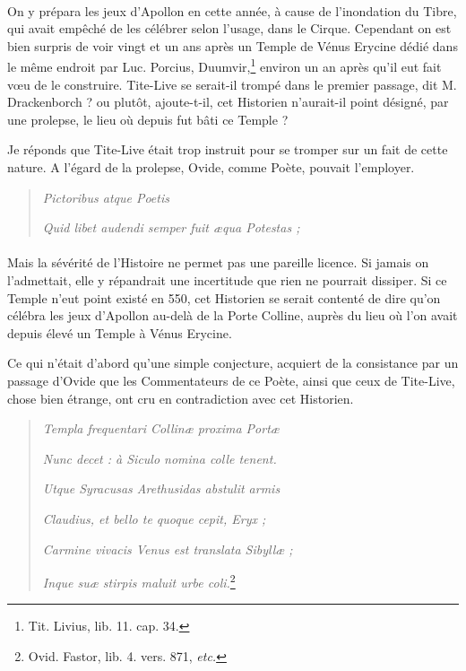 \documentclass[a4paper, 11pt, oneside, polutonikogreek, french]{article}
\begin{document}
\paragraph{}
On y prépara les jeux d'Apollon en cette année, à cause de l'inondation du Tibre, qui avait empêché de les célébrer selon l'usage, dans le Cirque. Cependant on est bien surpris de voir vingt et un ans après un Temple de Vénus Erycine dédié dans le même endroit par Luc. Porcius, Duumvir,\footnote{Tit. Livius, lib. 11. cap. 34.} environ un an après qu'il eut fait vœu de le construire. Tite-Live se serait-il trompé dans le premier passage, dit M. Drackenborch ? ou plutôt, ajoute-t-il, cet Historien n'aurait-il point désigné, par une prolepse, le lieu où depuis fut bâti ce Temple ?

Je réponds que Tite-Live était trop instruit pour se tromper sur un fait de cette nature. A l'égard de la prolepse, Ovide, comme Poète, pouvait l'employer.
\begin{quotation}
\hspace*{10mm}\emph{Pictoribus atque Poetis}

\emph{Quid libet audendi semper fuit æqua Potestas ;}
\end{quotation}
\paragraph{}
Mais la sévérité de l'Histoire ne permet pas une pareille licence. Si jamais on l'admettait, elle y répandrait une incertitude que rien ne pourrait dissiper. Si ce Temple n'eut point existé en 550, cet Historien se serait contenté de dire qu'on célébra les jeux d'Apollon au-delà de la Porte Colline, auprès du lieu où l'on avait depuis élevé un Temple à Vénus Erycine.

Ce qui n'était d'abord qu'une simple conjecture, acquiert de la consistance par un passage d'Ovide que les Commentateurs de ce Poète, ainsi que ceux de Tite-Live, chose bien étrange, ont cru en contradiction avec cet Historien.
\begin{quotation}
\emph{Templa frequentari Collinæ proxima Portæ}

\hspace*{5mm}\emph{Nunc decet : à Siculo nomina colle tenent.}

\emph{Utque Syracusas Arethusidas abstulit armis}

\hspace*{5mm}\emph{Claudius, et bello te quoque cepit, Eryx ;}

\emph{Carmine vivacis Venus est translata Sibyllæ ;}

\hspace*{5mm}\emph{Inque suæ stirpis maluit urbe coli.}\footnote{Ovid. Fastor, lib. 4. vers. 871, \emph{etc.}}
\end{quotation}
\end{document}

